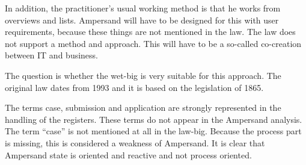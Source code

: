 {In addition, the practitioner's usual working method is that he works from overviews and lists. 
Ampersand will have to be designed for this with user requirements, because these things are not mentioned in the law. 
The law does not support a method and approach. 
This will have to be a so-called co-creation between IT and business.}

{The question is whether the wet-big is very suitable for this approach. 
The original law dates from 1993 and it is based on the legislation of 1865.}

{The terms case, submission and application are strongly represented in the handling of the registers. 
These terms do not appear in the Ampersand analysis. The term “case” is not mentioned at all in the law-big.
Because the process part is missing, this is considered a weakness of Ampersand. 
It is clear that Ampersand state is oriented and reactive and not process oriented.}